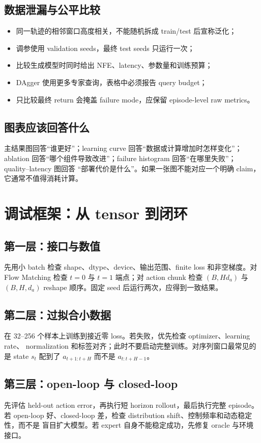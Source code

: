 \documentclass[10pt,twocolumn,a4paper]{ctexart}
\begin{document}
\subsection{数据泄漏与公平比较}
\begin{itemize}
  \item 同一轨迹的相邻窗口高度相关，不能随机拆成 train/test 后宣称泛化；
  \item 调参使用 validation seeds，最终 test seeds 只运行一次；
  \item 比较生成模型时同时给出 NFE、latency、参数量和训练预算；
  \item DAgger 使用更多专家查询，表格中必须报告 query budget；
  \item 只比较最终 return 会掩盖 failure mode，应保留 episode-level raw metrics。
\end{itemize}

\subsection{图表应该回答什么}
主结果图回答“谁更好”；learning curve 回答“数据或计算增加时怎样变化”；ablation
回答“哪个组件导致改进”；failure histogram 回答“在哪里失败”；quality--latency 图回答
“部署代价是什么”。如果一张图不能对应一个明确 claim，它通常不值得消耗计算。

\section{调试框架：从 tensor 到闭环}
\subsection{第一层：接口与数值}
先用小 batch 检查 shape、dtype、device、输出范围、finite loss 和非空梯度。对 Flow
Matching 检查 $t=0$ 与 $t=1$ 端点；对 action chunk 检查 $(B,Hd_a)$ 与
$(B,H,d_a)$ reshape 顺序。固定 seed 后运行两次，应得到一致结果。

\subsection{第二层：过拟合小数据}
在 32--256 个样本上训练到接近零 loss。若失败，优先检查 optimizer、learning rate、
normalization 和标签对齐；此时不要启动完整训练。对序列窗口最常见的是 state $s_t$
配到了 $a_{t+1:t+H}$ 而不是 $a_{t:t+H-1}$。

\subsection{第三层：open-loop 与 closed-loop}
先评估 held-out action error，再执行短 horizon rollout，最后执行完整 episode。若
open-loop 好、closed-loop 差，检查 distribution shift、控制频率和动态稳定性，而不是
盲目扩大模型。若 expert 自身不能稳定成功，先修复 oracle 与环境接口。
\end{document}
